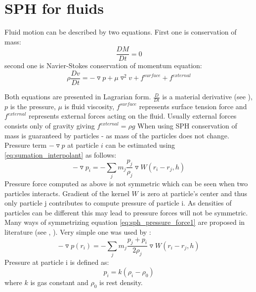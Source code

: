 \section{SPH for fluids}
Fluid motion can be described by two equations. First one is conservation of mass:
\begin{equation}
\label{eq:mass_conservation}
\frac{DM}{Dt} = 0
\end{equation}
second one is Navier-Stokes conservation of momentum equation:
\begin{equation}
\label{eq:momentum_conservation}
\rho \frac{Dv}{Dt} = -\triangledown p + \mu \triangledown^2v + f^{surface} +  f^{external}
\end{equation}

Both equations are presented in Lagrarian form. $\frac{D}{Dt}$ is a material derivative (see \cite[section 2.2]{Hauke2008}), $p$ is the pressure, $\mu$ is fluid viscosity, $f^{surface}$ represents surface tension force and $f^{external}$ represents external forces acting on the fluid. Usually external forces consists only of gravity giving $f^{external} = \rho g$
When using SPH conservation of mass is guaranteed by particles - as mass of the particles does not change. 
Pressure term $-\triangledown p$  at particle $i$ can be estimated using \ref{eq:sumation_interpolant} as follows:
\begin{equation}
\label{eq:sph_pressure_force1}
-\triangledown p_i = -\sum_{j}m_j \frac{p_j}{\rho_j}\triangledown W(r_i - r_j, h) 
\end{equation}
Pressure force computed as above is not symmetric which can be seen when two particles interacts. Gradient of the kernel $W$ is zero at particle's center and thus only particle j contributes to compute pressure of particle i. As densities of particles can be different this may lead to pressure forces will not be symmetric. Many ways of symmetrizing equation \ref{eq:sph_pressure_force1} are proposed in literature (see \cite[section 3.1]{Monaghan1992}, \cite[section 4.3.2]{Liu}). Very simple one was used by \cite{Muller2003}:
\begin{equation}
\label{eq:sph_pressure_force_muller}
-\triangledown p(r_i) = -\sum_{j}m_j \frac{p_j + p_i}{2\rho_j}\triangledown W(r_i - r_j, h) 
\end{equation}
Pressure at particle i is defined as:
\begin{equation}
\label{eq:pressure}
p_i = k(\rho_i - \rho_0)
\end{equation}
where $k$ is gas constant and $\rho_0$ is rest density.


